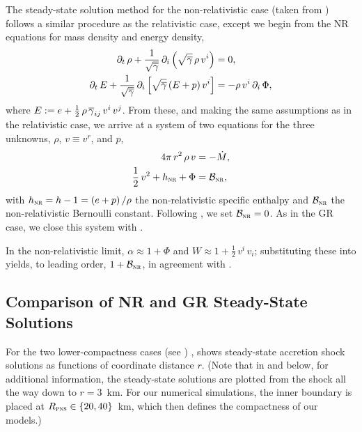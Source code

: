 The steady-state solution method for the non-relativistic case
(taken from \citet{bmd2003}) follows a similar procedure
as the relativistic case,
except we begin from the NR equations for mass density and energy density,
\begin{align}
  \partial_{t}\,\rho+\frac{1}{\sqrt{\overline{\gamma}}}\,
  \partial_{i}\left(\sqrt{\overline{\gamma}}\,\rho\,v^{i}\right)
  &=0,\\
  \partial_{t}\,E+\frac{1}{\sqrt{\overline{\gamma}}}\,
  \partial_{i}\left[\sqrt{\overline{\gamma}}\left(E+p\right)v^{i}\right]
  &=-\rho\,v^{i}\,\partial_{i}\,\Phi,
\end{align}
where $E:=e+\frac{1}{2}\,\rho\,\overline{\gamma}_{ij}\,v^{i}\,v^{j}$.
From these, and making the same assumptions as in the relativistic case,
we arrive at a system of two equations for the three unknowns,
$\rho$, $v\equiv v^{r}$, and $p$,
\begin{align}
  4\pi\,r^{2}\,\rho\,v&=-\dot{M},\label{eq.MassConservationNR}\\
  \frac{1}{2}\,v^{2}+h_{\textsc{nr}}+\Phi&=\mathcal{B}_{\textsc{nr}},
  \label{eq.BernoulliNR}
\end{align}
with $h_{\textsc{nr}}=h-1=\left(e+p\right)/\rho$
the non-relativistic specific enthalpy and $\mathcal{B}_{\textsc{nr}}$
the non-relativistic Bernoulli constant.
Following \citet{bmd2003}, we set $\mathcal{B}_{\textsc{nr}}=0$.
As in the GR case, we close this system with .

In the non-relativistic limit,
$\alpha\approx1+\Phi$ and $W\approx1+\frac{1}{2}\,v^{i}\,v_{i}$;
substituting these into  yields, to leading order,
$1+\mathcal{B}_{\textsc{nr}}$,
in agreement with .

\subsection{Comparison of NR and GR Steady-State Solutions}

For the two lower-compactness cases (see )
\citep[e.g., see][]{bmh2013,mjm2015,brv2020},
 shows steady-state accretion shock solutions
as functions of coordinate distance $r$.
(Note that in  and  below,
for additional information, the steady-state solutions are plotted from the shock all
the way down to $r=3$~km.
For our numerical simulations, the inner boundary is placed at
$R_{\textsc{pns}}\in\{20,40\}$~km, which then defines the compactness of our models.)

